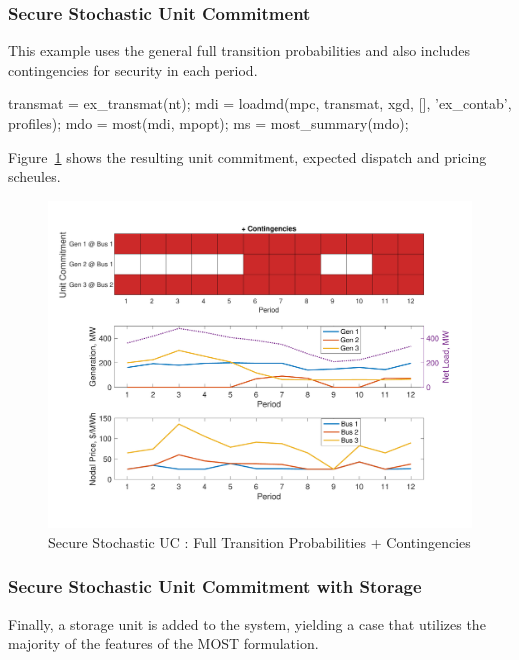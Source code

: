 \documentclass[12pt]{article}
\newcommand{\most}[0]{{MOST}}
\numberwithin{equation}{section}
\numberwithin{table}{section}
\numberwithin{figure}{section}
\begin{document}
\subsubsection*{Secure Stochastic Unit Commitment}

This example uses the general full transition probabilities and also includes contingencies for security in each period.
\begin{Code}
transmat = ex_transmat(nt);
mdi = loadmd(mpc, transmat, xgd, [], 'ex_contab', profiles);
mdo = most(mdi, mpopt);
ms = most_summary(mdo);
\end{Code}
Figure~\ref{fig:suc_ex_4} shows the resulting unit commitment, expected dispatch and pricing scheules.
\begin{figure}[hbtp]
  \centering
  \includegraphics[width=\textwidth]{./figures/suc-ex-4}
  \caption{Secure Stochastic UC : Full Transition Probabilities + Contingencies}
  \label{fig:suc_ex_4}
\end{figure}


\subsubsection*{Secure Stochastic Unit Commitment with Storage}

Finally, a storage unit is added to the system, yielding a case that utilizes the majority of the features of the \most{} formulation.
\end{document}
